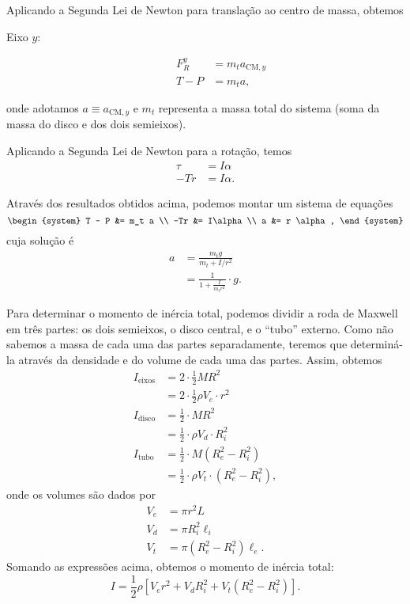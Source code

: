 Aplicando a Segunda Lei de Newton para translação ao centro de massa, obtemos
\begin{description}
\item[Eixo $y$:]
\begin{align}
    F_R^y &= m_t a_{\text{CM}, y} \\
    T - P &= m_t a,
\end{align}
\end{description}
%
onde adotamos $a \equiv a_{\text{CM}, y}$ e $m_t$ representa a massa total do sistema (soma da massa do disco e dos dois semieixos).

Aplicando a Segunda Lei de Newton para a rotação, temos
\begin{align}
    \tau &= I\alpha \\
    -Tr &= I\alpha.
\end{align}

Através dos resultados obtidos acima, podemos montar um sistema de equações
\begin{equation}
\begin{system}
    T - P &= m_t a \\
    -Tr &= I\alpha \\
    a &= r \alpha,
\end{system}
\end{equation}
%
cuja solução é
\begin{align}
    a &= \frac{m_t g}{m_t + I / r^2} \\
    &= \frac{1}{1+\frac{I}{m_t r^2}} \cdot g. \label{Eq:AcelRodaDeMaxwellGenerica}
\end{align}

Para determinar o momento de inércia total, podemos dividir a roda de Maxwell em três partes: os dois semieixos, o disco central, e o ``tubo'' externo. Como não sabemos a massa de cada uma das partes separadamente, teremos que determiná-la através da densidade e do volume de cada uma das partes. Assim, obtemos
\begin{align}
    I_{\text{eixos}} &= 2\cdot\frac{1}{2} MR^2 \\
    &=2\cdot \frac{1}{2} \rho V_e \cdot r^2 \\
    I_{\text{disco}} &= \frac{1}{2} \cdot MR^2 \\
    &= \frac{1}{2} \cdot\rho V_d \cdot R_i^2 \\
    I_{\text{tubo}} &= \frac{1}{2} \cdot M (R_e^2 - R_i^2) \\
    &= \frac{1}{2} \cdot \rho V_t \cdot (R_e^2 - R_i^2),
\end{align}
%
onde os volumes são dados por
\begin{align}
    V_e &= \pi r^2 L \\
    V_d &= \pi R_i^2 \ell_i \\
    V_t &= \pi (R_e^2 - R_i^2)\ell_e.
\end{align}
%
Somando as expressões acima, obtemos o momento de inércia total:
\begin{equation}\label{eq:MomentoDeInerciaTotal}
    I = \frac{1}{2} \rho [V_e r^2 + V_d R_i^2 + V_t (R_e^2 - R_i^2)].
\end{equation}

